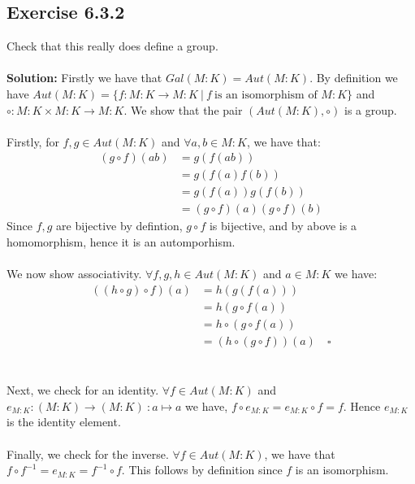 \documentclass{article}
\begin{document}
\subsection*{Exercise 6.3.2}
Check that this really does define a group.
\\\\
\textbf{Solution:}
Firstly we have that $Gal(M:K) = Aut(M:K)$.
By definition we have $Aut(M:K)= \{f: M:K \rightarrow M:K \ |\ f \ \text{is an isomorphism of } M:K\}$
and $\circ: M:K \times M:K \rightarrow M:K$.
We show that the pair $(Aut(M:K), \circ)$ is a group.\\\\
Firstly, for $f,g \in Aut(M:K)$ and $\forall a,b \in M:K$, we have that:
\begin{equation*}
    \begin{aligned}
        (g \circ f) (ab) & = g(f(ab))\\
        & = g(f(a)f(b))\\
        & = g(f(a))g(f(b))\\
        & = (g \circ f)(a)(g \circ f)(b)
    \end{aligned}
\end{equation*}
Since $f,g$ are bijective by defintion, $g \circ f$ is bijective, and by above is a homomorphism, hence it is an automporhism.
\\\\
We now show associativity. $\forall f,g,h \in Aut(M:K)$ and $a \in M:K$ we have:
\begin{equation*}
    \begin{aligned}
        ((h \circ g) \circ f) (a) & = h(g(f(a)))\\
        & = h(g \circ f(a))\\
        & = h \circ (g \circ f(a))\\
        & = (h \circ (g \circ f))(a) \quad \square
    \end{aligned}
\end{equation*}
\\\\
Next, we check for an identity. $\forall f \in Aut(M:K)$ and $e_{M:K}: (M:K) \rightarrow (M:K) \ : a \mapsto a$ we have, 
$f \circ e_{M:K} = e_{M:K} \circ f  = f$. Hence $e_{M:K}$ is the identity element.
\\\\
Finally, we check for the inverse. $\forall f \in Aut(M:K)$, we have that $f \circ f^{-1} = e_{M:K} = f^{-1} \circ f$.
This follows by definition since $f$ is an isomorphism.
\end{document}
